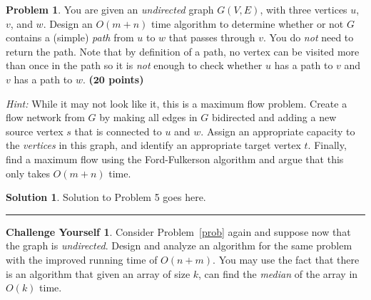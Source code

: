 \documentclass{article}
\theoremstyle{definition}
\newtheorem{problem}{Problem}
\newtheorem*{challenge}{Challenge Yourself}
\def\fline{\rule{0.75\linewidth}{0.5pt}}
\newcommand{\finishline}{\vspace{-15pt}\begin{center}\fline\end{center}}
\newtheorem*{solution*}{Solution}
\newenvironment{solution}{\begin{solution*}}{{\finishline} \end{solution*}}
\newcommand{\grade}[1]{\hfill{\textbf{($\mathbf{#1}$ points)}}}
\begin{document}
\begin{problem}
	You are given an \emph{undirected} graph $G(V, E)$, with three vertices $u$, $v$, and $w$. Design an
$O(m+n)$ time algorithm to determine whether or not $G$ contains a (simple) \emph{path} from $u$ to $w$ that passes through $v$. 
You do \emph{not} need to return the path. Note that by definition of a path, no vertex can be visited more than once in the path so it is \emph{not} enough to check whether $u$
has a path to $v$ and $v$ has a path to $w$. 
\grade{20}

\emph{Hint:} While it may not look like it, this is a maximum flow problem. Create a flow network from $G$ by making all edges in $G$ bidirected and adding a new source vertex $s$ that is connected to $u$ and $w$.  Assign an appropriate capacity to the {\em vertices} in this graph, and identify an appropriate target vertex $t$. Finally, find a maximum flow using the Ford-Fulkerson algorithm and argue that this only takes $O(m+n)$ time. 
\end{problem}

\begin{solution}
	Solution to Problem 5 goes here.  
\end{solution}


\begin{challenge}
	Consider Problem~\ref{prob} again and suppose now that the graph is \emph{undirected}. Design and analyze an algorithm for the same problem with the improved running time of $O(n+m)$. You may use the fact that there is an algorithm 
	that given an array of size $k$, can find the \emph{median} of the array in $O(k)$ time. 
\end{challenge}
\end{document}
